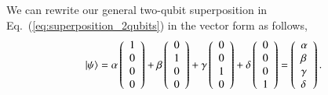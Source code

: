 We can rewrite our general two-qubit superposition in Eq.~(\ref{eq:superposition_2qubits}) in the vector form as follows,
\begin{equation}
\left| \psi \right\rangle=\alpha\left(\begin{array}{l}
1 \\
0 \\
0 \\
0
\end{array}\right) + \beta\left(\begin{array}{l}
0 \\
1 \\
0 \\
0
\end{array}\right)+\gamma\left(\begin{array}{l}
0 \\
0 \\
1 \\
0
\end{array}\right)+\delta\left(\begin{array}{l}
0 \\
0 \\
0 \\
1
\end{array}\right)=\left(\begin{array}{l}
\alpha \\
\beta \\
\gamma \\
\delta
\end{array}\right).
\end{equation}

